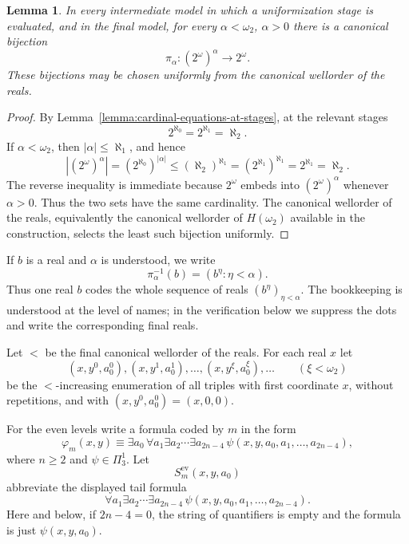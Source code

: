 \documentclass[a4paper,11pt]{article}
\newtheorem{lemma}[theorem]{Lemma}
\begin{document}
\begin{lemma}\label{lemma:compression-pi-alpha}
In every intermediate model in which a uniformization stage is evaluated, and in the final model, for every $\alpha<\omega_2$, $\alpha> 0$ there is a canonical bijection
\[
   \pi_\alpha:(2^\omega)^\alpha\longrightarrow 2^\omega .
\]
These bijections may be chosen uniformly from the canonical wellorder of the reals.
\end{lemma}

\begin{proof}
By Lemma~\ref{lemma:cardinal-equations-at-stages}, at the relevant stages
\[
   2^{\aleph_0}=2^{\aleph_1}=\aleph_2.
\]
If $\alpha<\omega_2$, then $|\alpha|\leq\aleph_1$, and hence
\[
   |(2^\omega)^\alpha|
   =(2^{\aleph_0})^{|\alpha|}
   \leq (\aleph_2)^{\aleph_1}
   =(2^{\aleph_1})^{\aleph_1}
   =2^{\aleph_1}
   =\aleph_2.
\]
The reverse inequality is immediate because $2^\omega$ embeds into $(2^\omega)^\alpha$ whenever $\alpha>0$.  Thus the two sets have the same cardinality.  The canonical wellorder of the reals, equivalently the canonical wellorder of $H(\omega_2)$ available in the construction, selects the least such bijection uniformly.
\end{proof}

If $b$ is a real and $\alpha$ is understood, we write
\[
\pi_\alpha^{-1}(b)=(b^\eta:\eta<\alpha).
\]
Thus one real $b$ codes the whole sequence of reals $(b^\eta)_{\eta<\alpha}$.  The bookkeeping is understood at the level of names; in the verification below we suppress the dots and write the corresponding final reals.

Let $<$ be the final canonical wellorder of the reals.  For each real $x$ let
\[
(x,y^0,a_0^0),(x,y^1,a_0^1),\ldots,(x,y^\xi,a_0^\xi),\ldots\qquad(\xi<\omega_2)
\]
be the $<$-increasing enumeration of all triples with first coordinate $x$, without repetitions, and with $(x,y^0,a_0^0)=(x,0,0)$.

For the even levels write a formula coded by $m$ in the form
\[
\varphi_m(x,y)\equiv
\exists a_0\,\forall a_1\exists a_2\cdots\exists a_{2n-4}\,
\psi(x,y,a_0,a_1,\ldots,a_{2n-4}),
\tag{E}
\]
where $n\geq 2$ and $\psi\in\Pi^1_3$.  Let
\[
S^{\mathrm{ev}}_m(x,y,a_0)
\]
abbreviate the displayed tail formula
\[
\forall a_1\exists a_2\cdots\exists a_{2n-4}\,
\psi(x,y,a_0,a_1,\ldots,a_{2n-4}).
\]
Here and below, if $2n-4=0$, the string of quantifiers is empty and the formula is just $\psi(x,y,a_0)$.
\end{document}
